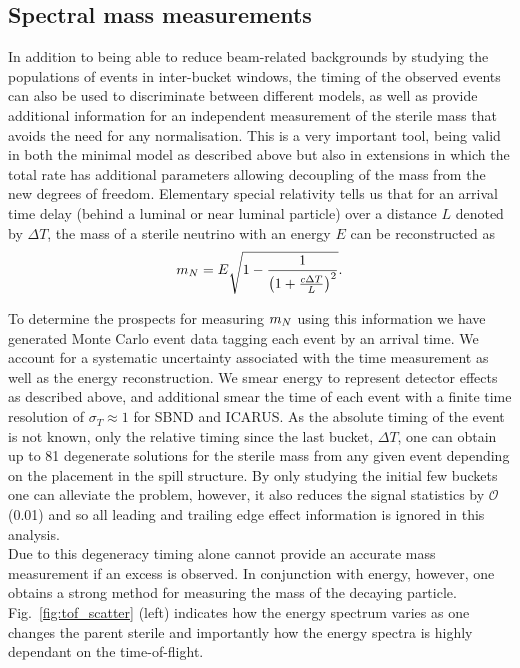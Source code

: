 \documentclass[11pt, a4paper]{article}
\newcommand{\reffig}[1]{Fig.~\ref{#1}}
\def\ster{\ensuremath N}
\begin{document}
\subsection{\label{sec:timing_physics} Spectral mass measurements}

In addition to being able to reduce beam-related backgrounds by studying the populations of events in
inter-bucket windows, the timing of the observed events can also be used to
discriminate between different models, as well as provide additional information for an independent
measurement of the sterile mass that avoids the need for any normalisation. This is a very important tool, being valid in both the minimal model as described above but also in extensions in which the total rate has additional parameters allowing decoupling of the mass from the new degrees of freedom. 
Elementary special relativity tells us that for an arrival time delay (behind a luminal or near luminal particle) over a
distance $L$ denoted by $\Delta T$, the mass of a sterile neutrino with an
energy $E$ can be reconstructed as 
%
\[ m_{\ster} = E\sqrt{1-\frac{1}{\left(1+\frac{c\Delta T}{L}\right)^2}}. \]

To determine the prospects for measuring $m_{\ster}$ using this information we
have generated Monte Carlo event data tagging each event by an arrival time.
We account for a systematic uncertainty associated with the time measurement as
well as the energy reconstruction. We smear energy to represent detector
effects as described above, and additional smear the time of each event with a
finite time resolution of $\sigma_T  \approx 1$ for SBND and ICARUS. As the
absolute timing of the event is not known, only the relative timing since the
last bucket, $\Delta T$, one can obtain up to 81 degenerate solutions for the
sterile mass from any given event depending on the placement in the spill
structure. By only studying the initial few buckets one can alleviate the
problem, however, it also reduces the signal statistics by $\mathcal{O}$(0.01)
and so all leading and trailing edge effect information is ignored in this analysis. \\

Due to this degeneracy timing alone cannot provide an accurate mass measurement if an excess is observed. In conjunction with energy, however, one obtains a strong method for measuring the mass of the decaying particle. \reffig{fig:tof_scatter} (left) indicates how the energy spectrum varies as one changes the parent sterile and importantly how the energy spectra is highly dependant on the time-of-flight. 
\end{document}
